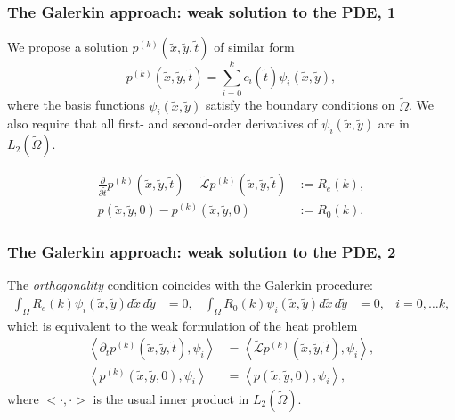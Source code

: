\documentclass{beamer}
\begin{document}
\begin{frame}
  \frametitle{The Galerkin approach: weak solution to the PDE, 1}
  We propose a solution $p^{(k)}(\tilde{x},\tilde{y},\tilde{t})$ of similar
  form
  \[
    p^{(k)}(\tilde{x},\tilde{y},\tilde{t}) = \sum_{i=0}^k c_i(\tilde{t})
    \psi_i(\tilde{x},\tilde{y}),
  \]
  where the basis functions $\psi_i(\tilde{x},\tilde{y})$ satisfy the
  boundary conditions on $\tilde{\Omega}$. We also require that all
  first- and second-order derivatives of $\psi_i(\tilde{x},\tilde{y})$
  are in $L_2(\tilde{\Omega})$.

  \begin{align*}
  \frac{\partial}{\partial \tilde{t}} p^{(k)}(\tilde{x},\tilde{y},\tilde{t}) - \tilde{\mathcal{L}}p^{(k)}(\tilde{x},\tilde{y},\tilde{t}) &:= R_e(k), \\
  p(\tilde{x},\tilde{y},0) - p^{(k)}(\tilde{x},\tilde{y},0) &:= R_0(k).
  \end{align*}
\end{frame}
\begin{frame}
  \frametitle{The Galerkin approach: weak solution to the PDE, 2}
  The \textit{orthogonality} condition coincides with the
  Galerkin procedure:
  \begin{align*}
    \displaystyle \int_{\Omega} R_e(k) \psi_i(\tilde{x},\tilde{y}) d\tilde{x}\,d\tilde{y} &= 0,& \displaystyle \int_{\Omega} R_0(k) \psi_i(\tilde{x},\tilde{y}) d\tilde{x}\,d\tilde{y} &= 0,& i = 0,\ldots k, 
  \end{align*}
  which is equivalent to the weak formulation of the heat problem
  \begin{align*}
    \left< \partial_t p^{(k)}(\tilde{x},\tilde{y},\tilde{t}), \psi_i \right> &= \left<\tilde{\mathcal{L}}p^{(k)}(\tilde{x},\tilde{y},\tilde{t}), \psi_i \right>, \\
    \left< p^{(k)}(\tilde{x},\tilde{y},0), \psi_i \right> &= \left<p(\tilde{x},\tilde{y},0), \psi_i\right>,
  \end{align*}
  where $<\cdot, \cdot>$ is the usual inner product in
  $L_2(\tilde{\Omega})$.
\end{frame}
\end{document}
